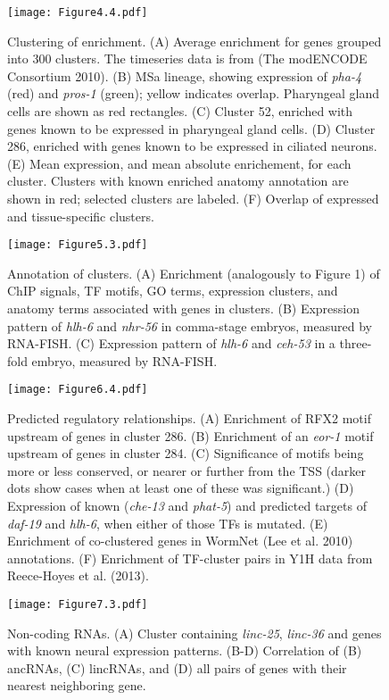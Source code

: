 \documentclass{article}
\begin{document}
\begin{figure}
\texttt{[image: Figure4.4.pdf]}
\caption{
Clustering of enrichment.
(A) Average enrichment for genes grouped into 300 clusters. The timeseries data is from (The modENCODE Consortium 2010). (B) MSa lineage, showing expression of {\em pha-4} (red) and {\em pros-1} (green); yellow indicates overlap. Pharyngeal gland cells are shown as red rectangles. (C) Cluster 52, enriched with genes known to be expressed in pharyngeal gland cells. (D) Cluster 286, enriched with genes known to be expressed in ciliated neurons. (E) Mean expression, and mean absolute enrichement, for each cluster. Clusters with known enriched anatomy annotation are shown in red; selected clusters are labeled. (F) Overlap of expressed and tissue-specific clusters.
}
\end{figure}
\clearpage

\begin{figure}
\texttt{[image: Figure5.3.pdf]}
\caption{
Annotation of clusters.
(A) Enrichment (analogously to Figure 1) of ChIP signals, TF motifs, GO terms, expression clusters, and anatomy terms associated with genes in clusters. (B) Expression pattern of {\em hlh-6} and {\em nhr-56}
 in comma-stage embryos, measured by RNA-FISH. (C) Expression pattern of {\em hlh-6} and {\em ceh-53} in a three-fold embryo, measured by RNA-FISH.
}
\end{figure}
\clearpage

\begin{figure}
\texttt{[image: Figure6.4.pdf]}
\caption{Predicted regulatory relationships.
(A) Enrichment of RFX2 motif upstream of genes in cluster 286. (B) Enrichment of an
{\em eor-1} motif upstream of genes in cluster 284. (C) Significance of motifs being more or less conserved, or nearer or further from the TSS (darker dots show cases when
at least one of these was significant.) (D) Expression of known ({\em che-13} and
{\em phat-5}) and predicted targets of {\em daf-19} and {\em hlh-6}, when either of
those TFs is mutated.
(E) Enrichment of co-clustered genes in WormNet (Lee et al. 2010) annotations. (F) Enrichment of TF-cluster pairs in Y1H data from Reece-Hoyes et al. (2013).
}
\end{figure}
\clearpage

\begin{figure}
\texttt{[image: Figure7.3.pdf]}
\caption{
Non-coding RNAs.
(A) Cluster containing {\em linc-25}, {\em linc-36}
 and genes with known neural expression patterns. (B-D) Correlation of (B) ancRNAs, (C) lincRNAs, and (D) all pairs of genes with their nearest neighboring gene.
}
\end{figure}
\clearpage
\end{document}
